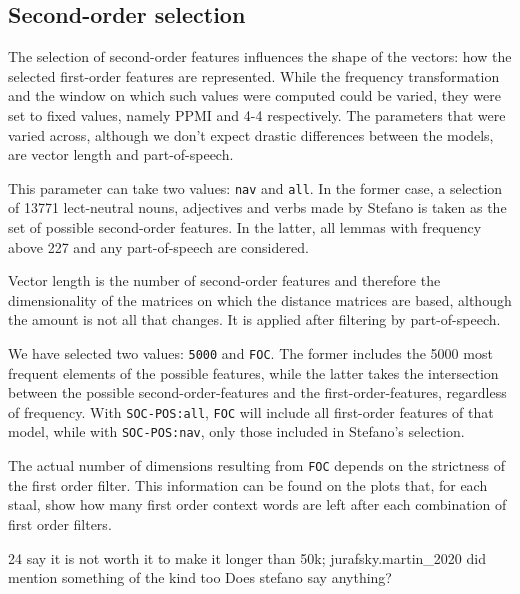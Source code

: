 \documentclass[
]{book}
\providecommand{\tightlist}{%
  \setlength{\itemsep}{0pt}\setlength{\parskip}{0pt}}
\begin{document}
\hypertarget{second-order-selection}{%
\subsection{Second-order selection}\label{second-order-selection}}

The selection of second-order features influences the shape of the vectors: how the selected first-order features are represented. While the frequency transformation and the window on which such values were computed could be varied, they were set to fixed values, namely PPMI and 4-4 respectively. The parameters that were varied across, although we don't expect drastic differences between the models, are vector length and part-of-speech.

\begin{description}
\tightlist
\item[\texttt{SOC-POS} (second order part-of-speech)]
This parameter can take two values: \texttt{nav} and \texttt{all}. In the former case, a selection of 13771 lect-neutral nouns, adjectives and verbs made by Stefano is taken as the set of possible second-order features. In the latter, all lemmas with frequency above 227 and any part-of-speech are considered.
\item[\texttt{LENGTH}]
Vector length is the number of second-order features and therefore the dimensionality of the matrices on which the distance matrices are based, although the amount is not all that changes. It is applied after filtering by part-of-speech.

We have selected two values: \texttt{5000} and \texttt{FOC}. The former includes the 5000 most frequent elements of the possible features, while the latter takes the intersection between the possible second-order-features and the first-order-features, regardless of frequency. With \texttt{SOC-POS:all}, \texttt{FOC} will include all first-order features of that model, while with \texttt{SOC-POS:nav}, only those included in Stefano's selection.

The actual number of dimensions resulting from \texttt{FOC} depends on the strictness of the first order filter. This information can be found on the plots that, for each staal, show how many first order context words are left after each combination of first order filters.
\end{description}

\textcite{kiela.clark_2014} 24 say it is not worth it to make it longer than 50k; jurafsky.martin\_2020 did mention something of the kind too
Does stefano say anything?
\end{document}
